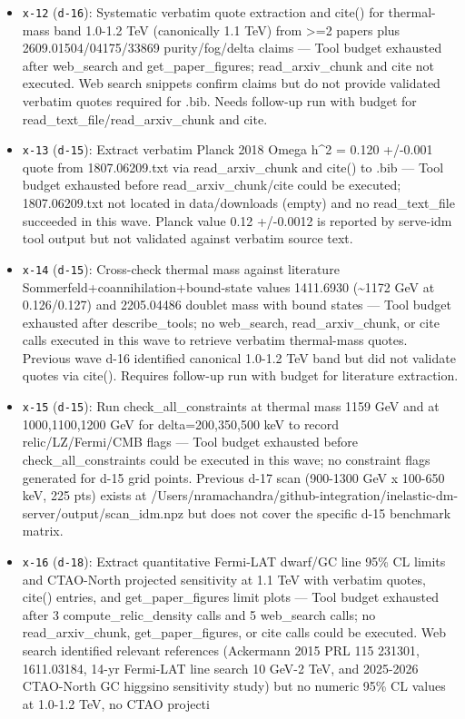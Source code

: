 \documentclass[11pt,a4paper]{article}
\begin{document}
\begin{itemize}
  \item \texttt{x-12} (\texttt{d-16}): Systematic verbatim quote extraction and cite() for thermal-mass band 1.0-1.2 TeV (canonically 1.1 TeV) from \textgreater{}=2 papers plus 2609.01504/04175/33869 purity/fog/delta claims --- Tool budget exhausted after web\_search and get\_paper\_figures; read\_arxiv\_chunk and cite not executed. Web search snippets confirm claims but do not provide validated verbatim quotes required for .bib. Needs follow-up run with budget for read\_text\_file/read\_arxiv\_chunk and cite.
  \item \texttt{x-13} (\texttt{d-15}): Extract verbatim Planck 2018 Omega h\textasciicircum{}2 = 0.120 +/-0.001 quote from 1807.06209.txt via read\_arxiv\_chunk and cite() to .bib --- Tool budget exhausted before read\_arxiv\_chunk/cite could be executed; 1807.06209.txt not located in data/downloads (empty) and no read\_text\_file succeeded in this wave. Planck value 0.12 +/-0.0012 is reported by serve-idm tool output but not validated against verbatim source text.
  \item \texttt{x-14} (\texttt{d-15}): Cross-check thermal mass against literature Sommerfeld+coannihilation+bound-state values 1411.6930 (\textasciitilde{}1172 GeV at 0.126/0.127) and 2205.04486 doublet mass with bound states --- Tool budget exhausted after describe\_tools; no web\_search, read\_arxiv\_chunk, or cite calls executed in this wave to retrieve verbatim thermal-mass quotes. Previous wave d-16 identified canonical 1.0-1.2 TeV band but did not validate quotes via cite(). Requires follow-up run with budget for literature extraction.
  \item \texttt{x-15} (\texttt{d-15}): Run check\_all\_constraints at thermal mass 1159 GeV and at 1000,1100,1200 GeV for delta=200,350,500 keV to record relic/LZ/Fermi/CMB flags --- Tool budget exhausted before check\_all\_constraints could be executed in this wave; no constraint flags generated for d-15 grid points. Previous d-17 scan (900-1300 GeV x 100-650 keV, 225 pts) exists at /Users/nramachandra/github-integration/inelastic-dm-server/output/scan\_idm.npz but does not cover the specific d-15 benchmark matrix.
  \item \texttt{x-16} (\texttt{d-18}): Extract quantitative Fermi-LAT dwarf/GC line 95\% CL limits and CTAO-North projected sensitivity at 1.1 TeV with verbatim quotes, cite() entries, and get\_paper\_figures limit plots --- Tool budget exhausted after 3 compute\_relic\_density calls and 5 web\_search calls; no read\_arxiv\_chunk, get\_paper\_figures, or cite calls could be executed. Web search identified relevant references (Ackermann 2015 PRL 115 231301, 1611.03184, 14-yr Fermi-LAT line search 10 GeV-2 TeV, and 2025-2026 CTAO-North GC higgsino sensitivity study) but no numeric 95\% CL values at 1.0-1.2 TeV, no CTAO projecti

\end{itemize}
\end{document}
